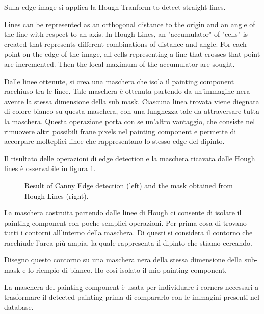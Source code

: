 \documentclass[10pt,twocolumn,letterpaper]{article}
\begin{document}
Sulla edge image si applica la Hough Tranform \cite{ballard1987generalizing} to detect straight lines. 

Lines can be represented as an orthogonal distance to the origin and an angle of the line with respect to an axis. In Hough Lines, an "accumulator" of "cells" is created that represents different combinations of distance and angle. For each point on the edge of the image, all cells representing a line that crosses that point are incremented. Then the local maximum of the accumulator are sought.

Dalle linee ottenute, si crea una maschera che isola il painting component racchiuso tra le linee. Tale maschera è ottenuta partendo da un'immagine nera avente la stessa dimensione della sub mask. Ciascuna linea trovata viene diegnata di colore bianco su questa maschera, con una lunghezza tale da attraversare tutta la maschera. Questa operazione porta con se un'altro vantaggio, che consiste nel rimuovere altri possibili frane pixels nel painting component e permette di accorpare molteplici linee che rappresentano lo stesso edge del dipinto.

Il risultato delle operazioni di edge detection e la maschera ricavata dalle Hough lines è osservabile in figura \ref{fig:cannyHough}.

\begin{figure}[t]
   \begin{center}
   \fbox{\rule{0pt}{2in} \rule{0.9\linewidth}{0pt}}
   \end{center}
      \caption{Result of Canny Edge detection (left) and the mask obtained from Hough Lines (right).}
   \label{fig:cannyHough}
\end{figure}


La maschera costruita partendo dalle linee di Hough ci consente di isolare il painting component con poche semplici operazioni. Per prima cosa di trovano tutti i contorni all'interno della maschera. Di questi si considera il contorno che racchiude l'area più ampia, la quale rappresenta il dipinto che stiamo cercando.

Disegno questo contorno su una maschera nera della stessa dimensione della sub-mask e lo riempio di bianco. Ho così isolato il mio painting component.

La maschera del painting component è usata per individuare i corners necessari a trasformare il detected painting prima di compararlo con le immagini presenti nel database.
\end{document}
